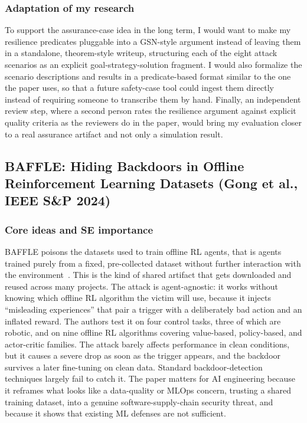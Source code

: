 \documentclass[11pt,a4paper]{article}
\begin{document}
\subsubsection{Adaptation of my research}

To support the assurance-case idea in the long term, I would want to make my resilience predicates pluggable into a GSN-style argument instead of leaving them in a standalone, theorem-style writeup, structuring each of the eight attack scenarios as an explicit goal-strategy-solution fragment. I would also formalize the scenario descriptions and results in a predicate-based format similar to the one the paper uses, so that a future safety-case tool could ingest them directly instead of requiring someone to transcribe them by hand. Finally, an independent review step, where a second person rates the resilience argument against explicit quality criteria as the reviewers do in the paper, would bring my evaluation closer to a real assurance artifact and not only a simulation result.

\subsection{BAFFLE: Hiding Backdoors in Offline Reinforcement Learning Datasets (Gong et al., IEEE S\&P 2024)}

\subsubsection{Core ideas and SE importance}

BAFFLE poisons the datasets used to train offline RL agents, that is agents trained purely from a fixed, pre-collected dataset without further interaction with the environment~\cite{gong2024baffle}. This is the kind of shared artifact that gets downloaded and reused across many projects. The attack is agent-agnostic: it works without knowing which offline RL algorithm the victim will use, because it injects ``misleading experiences'' that pair a trigger with a deliberately bad action and an inflated reward. The authors test it on four control tasks, three of which are robotic, and on nine offline RL algorithms covering value-based, policy-based, and actor-critic families. The attack barely affects performance in clean conditions, but it causes a severe drop as soon as the trigger appears, and the backdoor survives a later fine-tuning on clean data. Standard backdoor-detection techniques largely fail to catch it. The paper matters for AI engineering because it reframes what looks like a data-quality or MLOps concern, trusting a shared training dataset, into a genuine software-supply-chain security threat, and because it shows that existing ML defenses are not sufficient.
\end{document}
